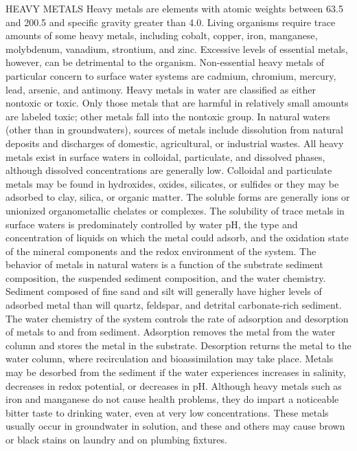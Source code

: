 \documentclass{article}
\begin{document}
HEAVY METALS Heavy metals are elements with atomic weights between 63.5
and 200.5 and specific gravity greater than 4.0. Living organisms
require trace amounts of some heavy metals, including cobalt, copper,
iron, manganese, molybdenum, vanadium, strontium, and zinc. Excessive
levels of essential metals, however, can be detrimental to the organism.
Non-essential heavy metals of particular concern to surface water
systems are cadmium, chromium, mercury, lead, arsenic, and antimony.
Heavy metals in water are classified as either nontoxic or toxic. Only
those metals that are harmful in relatively small amounts are labeled
toxic; other metals fall into the nontoxic group. In natural waters
(other than in groundwaters), sources of metals include dissolution from
natural deposits and discharges of domestic, agricultural, or industrial
wastes. All heavy metals exist in surface waters in colloidal,
particulate, and dissolved phases, although dissolved concentrations are
generally low. Colloidal and particulate metals may be found in
hydroxides, oxides, silicates, or sulfides or they may be adsorbed to
clay, silica, or organic matter. The soluble forms are generally ions or
unionized organometallic chelates or complexes. The solubility of trace
metals in surface waters is predominately controlled by water pH, the
type and concentration of liquids on which the metal could adsorb, and
the oxidation state of the mineral components and the redox environment
of the system. The behavior of metals in natural waters is a function of
the substrate sediment composition, the suspended sediment composition,
and the water chemistry. Sediment composed of fine sand and silt will
generally have higher levels of adsorbed metal than will quartz,
feldspar, and detrital carbonate-rich sediment. The water chemistry of
the system controls the rate of adsorption and desorption of metals to
and from sediment. Adsorption removes the metal from the water column
and stores the metal in the substrate. Desorption returns the metal to
the water column, where recirculation and bioassimilation may take
place. Metals may be desorbed from the sediment if the water experiences
increases in salinity, decreases in redox potential, or decreases in pH.
Although heavy metals such as iron and manganese do not cause health
problems, they do impart a noticeable bitter taste to drinking water,
even at very low concentrations. These metals usually occur in
groundwater in solution, and these and others may cause brown or black
stains on laundry and on plumbing fixtures.
\end{document}
